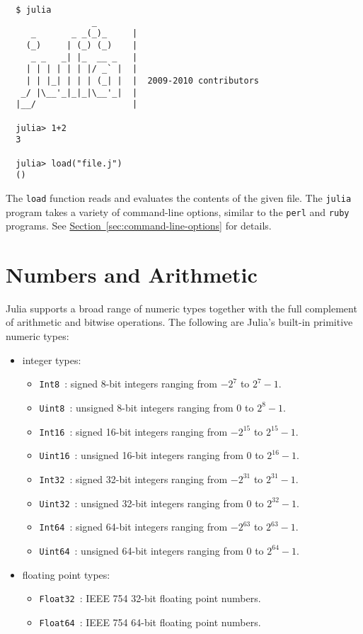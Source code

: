 \documentclass{article}
\newcommand{\Section}[1]{\hyperref[sec:#1]{Section~\ref*{sec:#1}}}
\begin{document}
\begin{verbatim}
  $ julia
                 _      
     _       _ _(_)_     |
    (_)     | (_) (_)    |  
     _ _   _| |_  __ _   |
    | | | | | | |/ _` |  |
    | | |_| | | | (_| |  |  2009-2010 contributors
   _/ |\__'_|_|_|\__'_|  |  
  |__/                   |

  julia> 1+2
  3

  julia> load("file.j")
  ()
\end{verbatim}
The \verb|load| function reads and evaluates the contents of the given file.
The \verb|julia| program takes a variety of command-line options, similar to the \verb|perl| and \verb|ruby| programs.
See \Section{command-line-options} for details.

\section{Numbers and Arithmetic}
Julia supports a broad range of numeric types together with the full complement of arithmetic and bitwise operations.
The following are Julia's built-in primitive numeric types:

\begin{itemize}
  \item integer types:
  \begin{itemize}
    \item \verb|Int8|~: signed 8-bit integers ranging from $-2^7$ to $2^7-1$.
    \item \verb|Uint8|~: unsigned 8-bit integers ranging from 0 to $2^8-1$.
    \item \verb|Int16|~: signed 16-bit integers ranging from $-2^{15}$ to $2^{15}-1$.
    \item \verb|Uint16|~: unsigned 16-bit integers ranging from 0 to $2^{16}-1$.
    \item \verb|Int32|~: signed 32-bit integers ranging from $-2^{31}$ to $2^{31}-1$.
    \item \verb|Uint32|~: unsigned 32-bit integers ranging from 0 to $2^{32}-1$.
    \item \verb|Int64|~: signed 64-bit integers ranging from $-2^{63}$ to $2^{63}-1$.
    \item \verb|Uint64|~: unsigned 64-bit integers ranging from 0 to $2^{64}-1$.
  \end{itemize}
  \item floating point types:
  \begin{itemize}
    \item \verb|Float32|~: IEEE 754 32-bit floating point numbers.
    \item \verb|Float64|~: IEEE 754 64-bit floating point numbers.
  \end{itemize}
\end{itemize}
\end{document}
